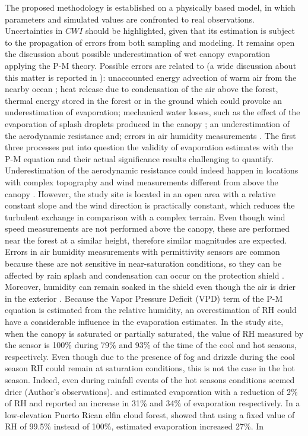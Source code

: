 \documentclass[a4paper,12pt]{article}
\begin{document}
\begin{linenumbers}
The proposed methodology is established on a physically based model, in which parameters and simulated values are confronted to real observations. Uncertainties in $CWI$ should be highlighted, given that its estimation is subject to the propagation of errors from both sampling and modeling. It remains open the discussion about possible underestimation of wet canopy evaporation applying the P-M theory. Possible errors are related to (a wide discussion about this matter is reported in \cite{vanDijketal2015}): unaccounted energy advection of warm air from the nearby ocean \citep{Shuttleworth1979, Schellekensetal1999, Holwerdaetal2010}; heat release due to condensation of the air above the forest, thermal energy stored in the forest or in the ground \citep{Scatena1990, Schellekensetal1999, VanDijketal2001, vanDijketal2015} which could provoke an underestimation of evaporation; mechanical water losses, such as the effect of the evaporation of splash droplets produced in the canopy \citep{Murakami2007, Dunkerley2009}; an underestimation of the aerodynamic resistance \citep{Holwerdaetal2012} and; errors in air humidity measurements \citep{Frumauetal2006, Holwerdaetal2010, Pryetetal2012a}. The first three processes put into question the validity of evaporation estimates with the P-M equation and their actual significance results challenging to quantify. Underestimation of the aerodynamic resistance could indeed happen in locations with complex topography and wind measurements different from above the canopy \citep{Holwerdaetal2012}. However, the study site is located in an open area with a relative constant slope and the wind direction is practically constant, which reduces the turbulent exchange in comparison with a complex terrain. Even though wind speed measurements are not performed above the canopy, these are performed near the forest at a similar height, therefore similar magnitudes are expected. Errors in air humidity measurements with permittivity sensors are common because these are not sensitive in near-saturation conditions, so they can be affected by rain splash and condensation can occur on the protection shield \citep{vanDijketal2015}. Moreover, humidity can remain soaked in the shield even though the air is drier in the exterior \citep{Pryetetal2012a}. Because the Vapor Pressure Deficit (VPD) term of the P-M equation is estimated from the relative humidity, an overestimation of RH could have a considerable influence in the evaporation estimates. In the study site, when the canopy is saturated or partially saturated, the value of RH measured by the sensor is 100\% during 79\% and 93\% of the time of the cool and hot seasons, respectively. Even though due to the presence of fog and drizzle during the cool season RH could remain at saturation conditions, this is not the case in the hot season. Indeed, even during rainfall events of the hot seasons conditions seemed drier (Author's observations). \cite{WallaceandMcJannet2008} and \cite{vanDijketal2015} estimated evaporation with a reduction of 2\% of RH and reported an increase in 31\% and 34\% of evaporation respectively. In a low-elevation Puerto Rican elfin cloud forest,\cite{Holwerdaetal2006} showed that using a fixed value of RH of 99.5\% instead of 100\%, estimated evaporation increased 27\%. In 
\end{linenumbers}
\end{document}
